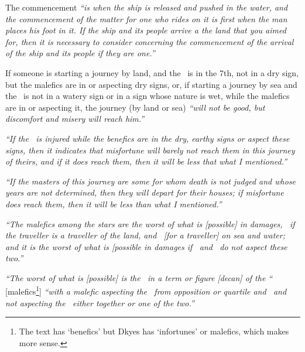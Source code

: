 The commencement \textsl{``is when the ship is released and pushed in the water, and the commencement of the matter for one who rides on it is first when the man places his foot in it. If the ship and its people arrive a the land that you aimed for, then it is necessary to consider concerning the commencement of the arrival of the ship and its people if they are one.''}

If someone is starting a journey by land, and the \Moon\, is in the 7th, not in a dry sign, but the malefics are in or aspecting dry signs, or, if starting a journey by sea and the \Moon\, is not in a watery sign or in a sign whose nature is wet, while the malefics are in or aspecting it, the journey (by land or sea) \textsl{``will not be good, but discomfort and misery will reach him.''}

\textsl{``If the \Moon\, is injured while the benefics are in the dry, earthy signs or aspect these signs, then it indicates that misfortune will barely not reach them in this journey of theirs, and if it does reach them, then it will be less that what I mentioned.''}

\textsl{``If the masters of this journey are some for whom death is not judged and whose years are not determined, then they will depart for their houses; if misfortune does reach them, then it will be less than what I mentioned.''}

\textsl{``The malefics among the stars are the worst of what is [possible] in damages, \Mars\, if the traveller is a traveller of the land, and \Saturn\, [for a traveller] on sea and water; and it is the worst of what is [possible in damages if \Jupiter\, and \Venus\, do not aspect these two.''}

\textsl{``The worst of what is [possible] is the \Moon\, in a term or figure [decan] of the ``} [malefics\footnote{The text has `benefics' but Dkyes has `infortunes' or malefics, which makes more sense.}] \textsl{``with a malefic aspecting the \Moon\, from opposition or quartile and \Jupiter\, and \Venus\, not aspecting the \Moon\, either together or one of the two.''}













